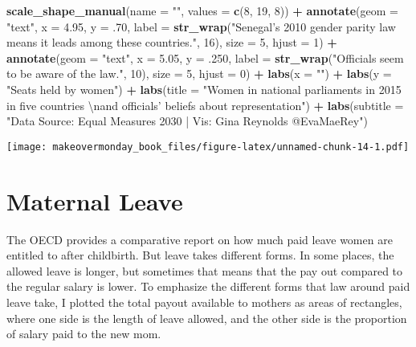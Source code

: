 \documentclass[]{book}
\newenvironment{Shaded}{\begin{snugshade}}{\end{snugshade}}
\newcommand{\KeywordTok}[1]{\textcolor[rgb]{0.13,0.29,0.53}{\textbf{#1}}}
\newcommand{\DataTypeTok}[1]{\textcolor[rgb]{0.13,0.29,0.53}{#1}}
\newcommand{\DecValTok}[1]{\textcolor[rgb]{0.00,0.00,0.81}{#1}}
\newcommand{\FloatTok}[1]{\textcolor[rgb]{0.00,0.00,0.81}{#1}}
\newcommand{\CharTok}[1]{\textcolor[rgb]{0.31,0.60,0.02}{#1}}
\newcommand{\StringTok}[1]{\textcolor[rgb]{0.31,0.60,0.02}{#1}}
\newcommand{\OperatorTok}[1]{\textcolor[rgb]{0.81,0.36,0.00}{\textbf{#1}}}
\newcommand{\NormalTok}[1]{#1}
\theoremstyle{definition}
\theoremstyle{definition}
\theoremstyle{definition}
\theoremstyle{remark}
\begin{document}
\begin{Shaded}
\begin{Highlighting}[]
\StringTok{  }\KeywordTok{scale_shape_manual}\NormalTok{(}\DataTypeTok{name =} \StringTok{""}\NormalTok{, }\DataTypeTok{values =} \KeywordTok{c}\NormalTok{(}\DecValTok{8}\NormalTok{, }\DecValTok{19}\NormalTok{, }\DecValTok{8}\NormalTok{)) }\OperatorTok{+}
\StringTok{  }\KeywordTok{annotate}\NormalTok{(}\DataTypeTok{geom =} \StringTok{"text"}\NormalTok{, }\DataTypeTok{x =} \FloatTok{4.95}\NormalTok{, }\DataTypeTok{y =}\NormalTok{ .}\DecValTok{70}\NormalTok{, }
           \DataTypeTok{label =} \KeywordTok{str_wrap}\NormalTok{(}\StringTok{"Senegal's 2010 gender parity law means it leads among these countries."}\NormalTok{, }\DecValTok{16}\NormalTok{), }\DataTypeTok{size =} \DecValTok{5}\NormalTok{, }\DataTypeTok{hjust =} \DecValTok{1}\NormalTok{) }\OperatorTok{+}
\StringTok{  }\KeywordTok{annotate}\NormalTok{(}\DataTypeTok{geom =} \StringTok{"text"}\NormalTok{, }\DataTypeTok{x =} \FloatTok{5.05}\NormalTok{, }\DataTypeTok{y =}\NormalTok{ .}\DecValTok{250}\NormalTok{, }
           \DataTypeTok{label =} \KeywordTok{str_wrap}\NormalTok{(}\StringTok{"Officials seem to be aware of the law."}\NormalTok{, }\DecValTok{10}\NormalTok{), }\DataTypeTok{size =} \DecValTok{5}\NormalTok{, }\DataTypeTok{hjust =} \DecValTok{0}\NormalTok{) }\OperatorTok{+}
\StringTok{  }\KeywordTok{labs}\NormalTok{(}\DataTypeTok{x =} \StringTok{""}\NormalTok{) }\OperatorTok{+}
\StringTok{  }\KeywordTok{labs}\NormalTok{(}\DataTypeTok{y =} \StringTok{"Seats held by women"}\NormalTok{) }\OperatorTok{+}
\StringTok{  }\KeywordTok{labs}\NormalTok{(}\DataTypeTok{title =} \StringTok{"Women in national parliaments in 2015 in five countries }\CharTok{\textbackslash{}n}\StringTok{and officials' beliefs about representation"}\NormalTok{) }\OperatorTok{+}
\StringTok{  }\KeywordTok{labs}\NormalTok{(}\DataTypeTok{subtitle =} \StringTok{"Data Source: Equal Measures 2030 | Vis: Gina Reynolds @EvaMaeRey"}\NormalTok{) }
\end{Highlighting}
\end{Shaded}

\texttt{[image: makeovermonday\_book\_files/figure-latex/unnamed-chunk-14-1.pdf]}

\chapter{Maternal Leave}\label{maternal-leave}

The OECD provides a comparative report on how much paid leave women are
entitled to after childbirth. But leave takes different forms. In some
places, the allowed leave is longer, but sometimes that means that the
pay out compared to the regular salary is lower. To emphasize the
different forms that law around paid leave take, I plotted the total
payout available to mothers as areas of rectangles, where one side is
the length of leave allowed, and the other side is the proportion of
salary paid to the new mom.
\end{document}
